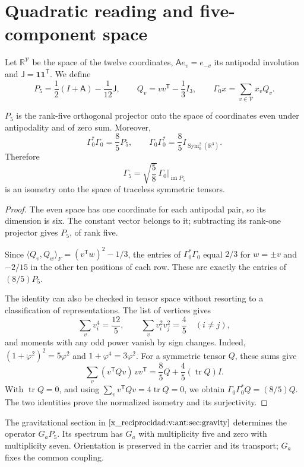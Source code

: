 \section{Quadratic reading and five-component space}
Let \(\mathbb R^{\mathcal V}\) be the space of the twelve coordinates,
\(\mathsf A e_v=e_{-v}\) its antipodal involution and
\(\mathsf J=\mathbf1\mathbf1^{\mathsf T}\). We define
\[
 P_5=\frac12(I+\mathsf A)-\frac1{12}\mathsf J,\qquad
 Q_v=vv^{\mathsf T}-\frac13I_3,\qquad
 \Gamma_0x=\sum_{v\in\mathcal V}x_vQ_v.
\]
\begin{theorem}
\label{x_reciprocidad:vii:thm:portador-pentacomponente}
\(P_5\) is the rank-five orthogonal projector onto the space of
coordinates even under antipodality and of zero sum. Moreover,
\[
 \Gamma_0^*\Gamma_0=\frac85P_5,\qquad
 \Gamma_0\Gamma_0^*=\frac85I_{\operatorname{Sym}^2_0(\mathbb R^3)}.
\]
Therefore
\[
 \Gamma_5=\sqrt{\frac58}\,\Gamma_0|_{\operatorname{im}P_5}
\]
is an isometry onto the space of traceless symmetric tensors.
\end{theorem}
\begin{proof}
The even space has one coordinate for each antipodal pair, so
its dimension is six. The constant vector belongs to it; subtracting its
rank-one projector gives \(P_5\), of rank five.

Since
\(\langle Q_v,Q_w\rangle_F=(v^{\mathsf T}w)^2-1/3\), the entries
of \(\Gamma_0^*\Gamma_0\) equal \(2/3\) for \(w=\pm v\) and
\(-2/15\) in the other ten positions of each row. These are
exactly the entries of \((8/5)P_5\).

The identity can also be checked in tensor space without
resorting to a classification of representations. The list of vertices gives
\[
 \sum_vv_i^4=\frac{12}{5},\qquad
 \sum_vv_i^2v_j^2=\frac45\quad(i\ne j),
\]
and moments with any odd power vanish by sign
changes. Indeed,
\((1+\varphi^2)^2=5\varphi^2\) and \(1+\varphi^4=3\varphi^2\).
For a symmetric tensor \(Q\), these sums give
\[
 \sum_v(v^{\mathsf T}Qv)\,vv^{\mathsf T}
 =\frac85Q+\frac45(\operatorname{tr}Q)I.
\]
With \(\operatorname{tr}Q=0\), and using
\(\sum_vv^{\mathsf T}Qv=4\operatorname{tr}Q=0\), we obtain
\(\Gamma_0\Gamma_0^*Q=(8/5)Q\). The two identities prove
the normalized isometry and its surjectivity.
\end{proof}

The gravitational section in \(\ref{x_reciprocidad:v:ant:sec:gravity}\) determines the
operator \(G_aP_5\). Its spectrum has \(G_a\) with multiplicity
five and zero with multiplicity seven. Orientation is preserved in
the carrier and its transport; \(G_a\) fixes the common coupling.

